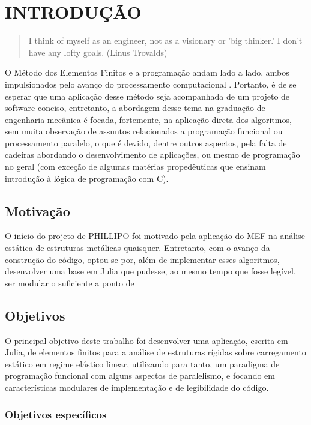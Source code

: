 

\chapter{INTRODUÇÃO}

\begin{quote}
    I think of myself as an engineer, not as a visionary or 'big thinker.' I don't have any lofty goals.
    (Linus Trovalds)  
\end{quote}

O Método dos Elementos Finitos e a programação andam lado a lado, ambos impulsionados pelo avanço do processamento computacional \cite{Zin}. Portanto, é de se esperar que uma aplicação desse método seja acompanhada de um projeto de software conciso, entretanto, a abordagem desse tema na graduação de engenharia mecânica é focada, fortemente, na aplicação direta dos algoritmos, sem muita observação de assuntos relacionados a programação funcional ou processamento paralelo, o que é devido, dentre outros aspectos, pela falta de cadeiras abordando o desenvolvimento de aplicações, ou mesmo de programação no geral (com exceção de algumas matérias propedêuticas que ensinam introdução à lógica de programação com C).

\section{Motivação}


O início do projeto de PHILLIPO foi motivado pela aplicação do MEF na análise estática de estruturas metálicas quaisquer. Entretanto, com o avanço da construção do código, optou-se por, além de implementar esses algoritmos, desenvolver uma base em Julia que pudesse, ao mesmo tempo que fosse legível, ser modular o suficiente a ponto de 

\section{Objetivos}

O principal objetivo deste trabalho foi desenvolver uma aplicação, escrita em Julia, de elementos finitos para a análise de estruturas rígidas sobre carregamento estático em regime elástico linear, utilizando para tanto, um paradigma de programação funcional com alguns aspectos de paralelismo, e focando em características modulares de implementação e de legibilidade do código.

\subsection{Objetivos específicos}

